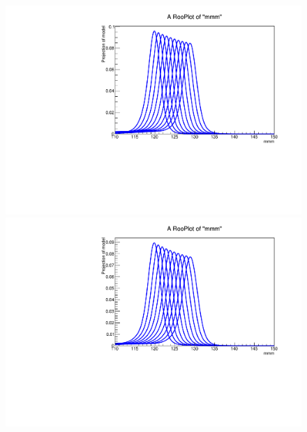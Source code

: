 \begin{figure}[hbp]
  \includegraphics[width=0.49\linewidth]{figures/signal_model/AppendixBdt/interpolation_GluGlu_cat8.pdf}
  \includegraphics[width=0.49\linewidth]{figures/signal_model/AppendixBdt/interpolation_VBF_cat8.pdf}
  \caption{}
  \label{fig:higgs_signalmodel_gluvbfc6c8}
\end{figure}
